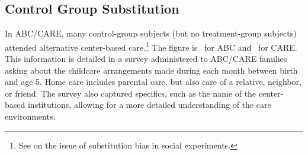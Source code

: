 \subsection{Control Group Substitution}

In ABC/CARE, many control-group subjects (but no treatment-group subjects) attended alternative center-based care.\footnote{See \cite{Heckman_Hohmann_etal_2000_QJE} on the issue of substitution bias in social experiments.} The figure is \treatsubsabc\ for ABC and \treatsubscarec\ for CARE. This information is detailed in a survey administered to ABC/CARE families asking about the childcare arrangements made during each month between birth and age 5. Home care includes parental care, but also care of a relative, neighbor, or friend. The survey also captured specifics, such as the name of the center-based institutions, allowing for a more detailed understanding of the care environments.

